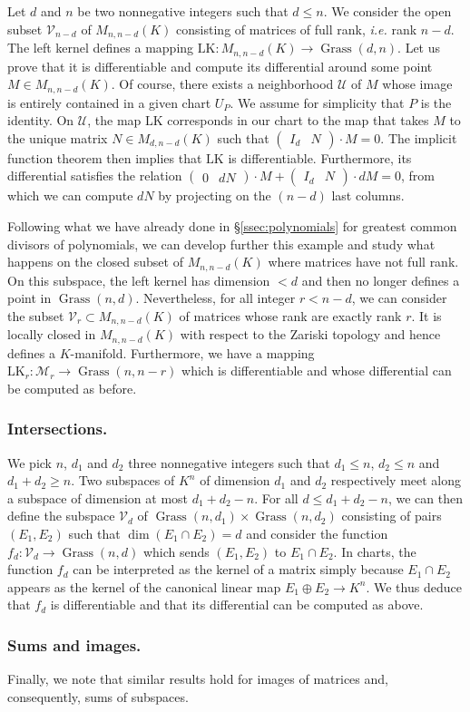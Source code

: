 \documentclass{lms}
\DeclareMathOperator{\Grass}{Grass}
\begin{document}
Let $d$ and $n$ be two nonnegative integers such that $d \leq n$.
We consider the open subset $\mathcal V_{n-d}$ of $M_{n,n-d}(K)$ 
consisting of matrices of full rank, \emph{i.e.} rank $n-d$. The left 
kernel defines a mapping $\text{LK} : M_{n,n-d}(K) \to \Grass(d,n)$. Let 
us prove that it is differentiable and compute its differential around 
some point $M \in M_{n,n-d}(K)$. Of course, there exists a neighborhood 
$\mathcal U$ of $M$ whose image is entirely contained in a given chart 
$U_P$. We assume for simplicity that $P$ is the identity. On $\mathcal 
U$, the map $\text{LK}$ corresponds in our chart to the map that 
takes $M$ to the unique matrix $N \in M_{d, n-d}(K)$ such that 
$\begin{pmatrix} I_d & N \end{pmatrix} \cdot M = 0$. The implicit 
function theorem then implies that $\text{LK}$ is differentiable. 
Furthermore, its differential satisfies the relation
$\begin{pmatrix} 0 & dN \end{pmatrix} \cdot M +
\begin{pmatrix} I_d & N \end{pmatrix} \cdot dM = 0$,
from which we can compute $dN$ by projecting on the $(n-d)$ last
columns.

Following what we have already done in \S \ref{ssec:polynomials} for 
greatest common divisors of polynomials, we can develop further this 
example and study what happens on the closed subset of $M_{n,n-d}(K)$ 
where matrices have not full rank. On this subspace, the left kernel has 
dimension $< d$ and then no longer defines a point in $\Grass(n,d)$. 
Nevertheless, for all integer $r < n-d$, we can consider the subset 
$\mathcal V_r \subset M_{n,n-d}(K)$ of matrices whose rank are exactly 
rank $r$. It is locally closed in $M_{n,n-d}(K)$ with respect to the 
Zariski topology and hence defines a $K$-manifold. Furthermore, we have a 
mapping $\text{LK}_r : \mathcal M_r \to \Grass(n,n-r)$ which is 
differentiable and whose differential can be computed as before.

\subsubsection*{Intersections.}

We pick $n$, $d_1$ and 
$d_2$ three nonnegative integers such that $d_1 \leq n$, $d_2 \leq n$ 
and $d_1 + d_2 \geq n$. Two subspaces of $K^n$ of dimension $d_1$ and 
$d_2$ respectively meet along a subspace of dimension at most $d_1 + d_2 
- n$. For all $d \leq d_1 + d_2 -n$, we can then define the subspace 
$\mathcal V_d$ of $\Grass(n,d_1) \times \Grass(n,d_2)$ consisting of 
pairs $(E_1, E_2)$ such that $\dim (E_1 \cap E_2) = d$ and consider the 
function $f_d : \mathcal V_d \to \Grass(n, d)$ which sends $(E_1, E_2)$ 
to $E_1 \cap E_2$. In charts, the function $f_d$ can be interpreted as
the kernel of a matrix simply because $E_1 \cap E_2$ appears as the
kernel of the canonical linear map $E_1 \oplus E_2 \to K^n$. We thus deduce
that $f_d$ is differentiable and that its differential can be
computed as above.

\subsubsection*{Sums and images.}

Finally, we note that similar results hold for images of matrices and,
consequently, sums of subspaces.



\end{document}
